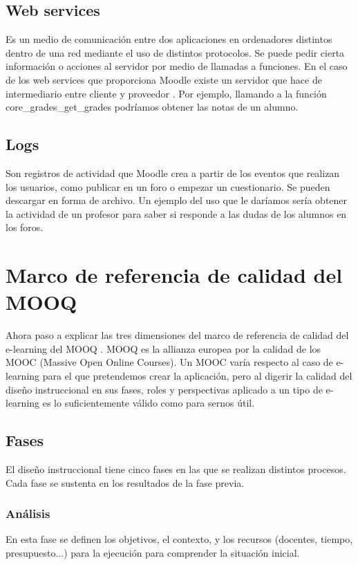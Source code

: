\subsection{Web services}

Es un medio de comunicación entre dos aplicaciones en ordenadores distintos dentro de una red mediante el uso de distintos protocolos. Se puede pedir cierta información o acciones al servidor por medio de llamadas a funciones. En el caso de los web services que proporciona Moodle existe un servidor que hace de intermediario entre cliente y proveedor \cite{moodle-2020}. Por ejemplo, llamando a la función 	core\_grades\_get\_grades podríamos obtener las notas de un alumno.

\subsection{Logs}
Son registros de actividad que Moodle crea a partir de los eventos que realizan los usuarios, como publicar en un foro o empezar un cuestionario. Se pueden descargar en forma de archivo. Un ejemplo del uso que le daríamos sería obtener la actividad de un profesor para saber si responde a las dudas de los alumnos en los foros.

\section{Marco de referencia de calidad del MOOQ}
Ahora paso a explicar las tres dimensiones del marco de referencia de calidad del e-learning del MOOQ \cite{stracke2018quality}. MOOQ es la allianza europea por la calidad de los MOOC (Massive Open Online Courses). Un MOOC varía respecto al caso de e-learning para el que pretendemos crear la aplicación, pero al digerir la calidad del diseño instruccional en sus fases, roles y perspectivas aplicado a un tipo de e-learning es lo suficientemente válido como para sernos útil.
\subsection{Fases}
El diseño instruccional tiene cinco fases en las que se realizan distintos procesos. Cada fase se sustenta en los resultados de la fase previa.
\subsubsection{Análisis}
En esta fase se definen los objetivos, el contexto, y los recursos (docentes, tiempo, presupuesto...) para la ejecución para comprender la situación inicial.

